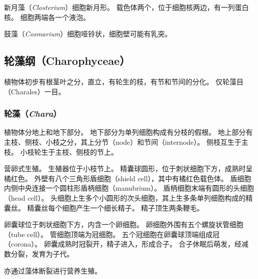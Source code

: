 \documentclass[11pt]{article}
\begin{document}
\newline

新月藻（\textit{Closterium}）细胞新月形。
载色体两个，位于细胞核两边，有一列蛋白核。
细胞两端各一个液泡。

\newline

鼓藻（\textit{Cosmarium}）细胞哑铃状，细胞壁可能有乳突。

\subsection{轮藻纲（Charophyceae）}
植物体初步有根茎叶之分，直立，有轮生的枝，有节和节间的分化。
仅轮藻目（Charales）一目。

\subsubsection{轮藻（\textit{Chara}）}
植物体分地上和地下部分。
地下部分为单列细胞构成有分枝的假根。
地上部分有主枝、侧枝、小枝之分，其上分节（node）和节间（internode）。
侧枝互生于主枝。
小枝轮生于主枝、侧枝的节上。

\newline

营卵式生殖。
生殖器位于小枝节上。
精囊球圆形，位于刺状细胞下方，成熟时呈橘红色。
外壁有八个三角形盾细胞（shield cell），其中有橘红色载色体。
盾细胞内侧中央连接一个圆柱形盾柄细胞（manubrium）。
盾柄细胞末端有圆形的头细胞（head cell）。
头细胞上生多个小圆形的次头细胞，其上生多条单列细胞构成的精囊丝。
精囊丝每个细胞产生一个细长精子。
精子顶生两条鞭毛。

\newline

卵囊球位于刺状细胞下方，内含一个卵细胞。
卵细胞外围有五个螺旋状管细胞（tube cell）。
管细胞顶端为冠细胞。
五个冠细胞在卵囊球顶端组成冠（corona）。
卵囊成熟时冠裂开，精子进入，形成合子。
合子休眠后萌发，经减数分裂，发育为子代。

\newline

亦通过藻体断裂进行营养生殖。
\end{document}
